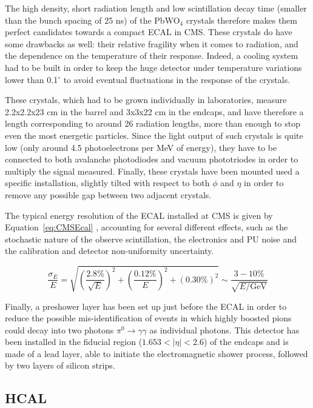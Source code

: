 \documentclass[a4paper, 10pt, openright]{report}
\begin{document}
The high density, short radiation length and low scintillation decay time (smaller than the bunch spacing of 25 ns) of the PbWO$_4$ crystals therefore makes them perfect candidates towards a compact \ac{ECAL} in \ac{CMS}. These crystals do have some drawbacks as well: their relative fragility when it comes to radiation, and the dependence on the temperature of their response. Indeed, a cooling system had to be built in order to keep the huge detector under temperature variations lower than 0.1$^\circ$ to avoid eventual fluctuations in the response of the crystals.

These crystals, which had to be grown individually in laboratories, measure 2.2x2.2x23 cm in the barrel and 3x3x22 cm in the endcaps, and have therefore a length corresponding to around 26 radiation lengths, more than enough to stop even the most energetic particles. Since the light output of such crystals is quite low (only around 4.5 photoelectrons per MeV of energy), they have to be connected to both avalanche photodiodes and vacuum phototriodes in order to multiply the signal measured. Finally, these crystals have been mounted used a specific installation, slightly tilted with respect to both $\phi$ and $\eta$ in order to remove any possible gap between two adjacent crystals.

The typical energy resolution of the \ac{ECAL} installed at \ac{CMS} is given by Equation~\ref{eq:CMSEcal} \cite{CMSDescription}, accounting for several different effects, such as the stochastic nature of the observe scintillation, the electronics and \ac{PU} noise and the calibration and detector non-uniformity uncertainty.

\begin{equation}
\label{eq:CMSEcal}
\frac{\sigma_E}{E} = \sqrt{\left ( \frac{2.8 \%}{\sqrt{E}} \right)^2 + \left ( \frac{0.12 \%}{E} \right )^2 + (0.30 \%)^2} \sim \frac{3-10\%}{\sqrt{E/\text{GeV}}}
\end{equation}

Finally, a preshower layer has been set up just before the \ac{ECAL} in order to reduce the possible mis-identification of events in which highly boosted pions could decay into two photons $\pi^0 \rightarrow \gamma \gamma$ as individual photons. This detector has been installed in the fiducial region ($1.653 < |\eta| < 2.6$) of the endcaps and is made of a lead layer, able to initiate the electromagnetic shower process, followed by two layers of silicon strips.

\subsection{\acf{HCAL}}\label{subsection:HCAL}
\end{document}
